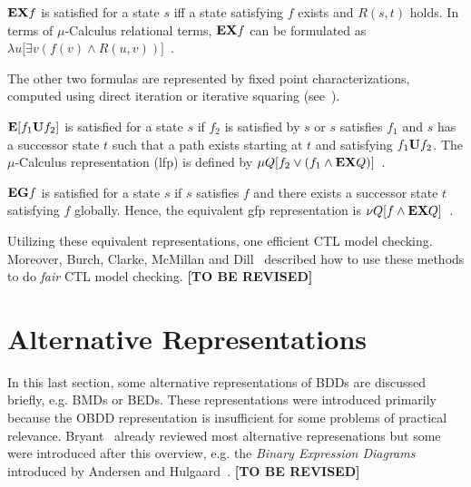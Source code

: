 \documentclass{vldb}
\newcommand{\tbr}{\textbf{[TO BE REVISED]}}
\begin{document}
$\text{\textbf{EX}} f$ is satisfied for a state $s$ iff a state satisfying $f$
exists and $R \left( s, t \right)$ holds. In terms of $\mu$-Calculus relational
terms, $\text{\textbf{EX}} f$ can be formulated as
$\lambda u \lbrack \exists v \left( f(v) \land R \left( u, v \right) \right) \rbrack$~\cite{BURCH90}.

The other two formulas are represented by fixed point characterizations, computed
using direct iteration or iterative squaring (see~\cite[p. 433]{BURCH90}).

$\text{\textbf{E}} \lbrack f_1 \text{\textbf{U}} f_2 \rbrack$ is satisfied for a
state $s$ if $f_2$ is satisfied by $s$ or $s$ satisfies $f_1$ and $s$ has a
successor state $t$ such that a path exists starting at $t$ and satisfying
$f_1 \text{\textbf{U}} f_2$. The $\mu$-Calculus representation (lfp) is defined by
$\mu Q \lbrack f_2 \lor \left( f_1 \land \text{\textbf{EX}} Q \right) \rbrack$~\cite{BURCH90}.

$\text{\textbf{EG}} f$ is satisfied for a state $s$ if $s$ satisfies $f$ and there
exists a successor state $t$ satisfying $f$ globally. Hence, the equivalent 
gfp representation is
$\nu Q \lbrack f \land \text{\textbf{EX}} Q \rbrack$~\cite{BURCH90}.

Utilizing these equivalent representations, one efficient CTL model checking.
Moreover, Burch, Clarke, McMillan and Dill~\cite{BURCH90-2} described how to use
these methods to do \textit{fair} CTL model checking. \tbr

\section{Alternative Representations}
\label{sec:alternative-representations}

In this last section, some alternative representations of BDDs are discussed
briefly, e.g. BMDs or BEDs. These representations were introduced primarily
because the OBDD representation is insufficient for some problems of practical
relevance. Bryant~\cite{BRYANT95} already reviewed most alternative represenations
but some were introduced after this overview, e.g. the
\textit{Binary Expression Diagrams} introduced by Andersen and
Hulgaard~\cite{ANDERSEN97}. \tbr

\balance



\end{document}
